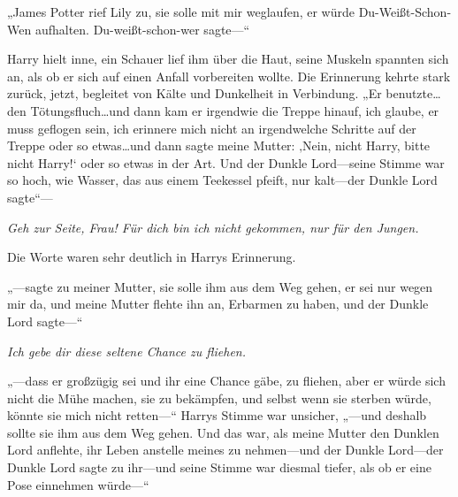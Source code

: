 „James Potter rief Lily zu, sie solle mit mir weglaufen, er würde Du-Weißt-Schon-Wen aufhalten. Du-weißt-schon-wer sagte—“

Harry hielt inne, ein Schauer lief ihm über die Haut, seine Muskeln spannten sich an, als ob er sich auf einen Anfall vorbereiten wollte. Die Erinnerung kehrte stark zurück, jetzt, begleitet von Kälte und Dunkelheit in Verbindung.
„Er benutzte…den Tötungsfluch…und dann kam er irgendwie die Treppe hinauf, ich glaube, er muss geflogen sein, ich erinnere mich nicht an irgendwelche Schritte auf der Treppe oder so etwas…und dann sagte meine Mutter: ‚Nein, nicht Harry, bitte nicht Harry!‘ oder so etwas in der Art. Und der Dunkle Lord—seine Stimme war so hoch, wie Wasser, das aus einem Teekessel pfeift, nur kalt—der Dunkle Lord sagte“—

\emph{Geh zur Seite, Frau! Für dich bin ich nicht gekommen, nur für den Jungen.}

Die Worte waren sehr deutlich in Harrys Erinnerung.

„—sagte zu meiner Mutter, sie solle ihm aus dem Weg gehen, er sei nur wegen mir da, und meine Mutter flehte ihn an, Erbarmen zu haben, und der Dunkle Lord sagte—“

\emph{Ich gebe dir diese seltene Chance zu fliehen.}

„—dass er großzügig sei und ihr eine Chance gäbe, zu fliehen, aber er würde sich nicht die Mühe machen, sie zu bekämpfen, und selbst wenn sie sterben würde, könnte sie mich nicht retten—“ Harrys Stimme war unsicher, „—und deshalb sollte sie ihm aus dem Weg gehen. Und das war, als meine Mutter den Dunklen Lord anflehte, ihr Leben anstelle meines zu nehmen—und der Dunkle Lord—der Dunkle Lord sagte zu ihr—und seine Stimme war diesmal tiefer, als ob er eine Pose einnehmen würde—“

